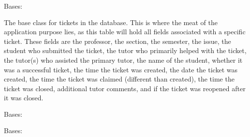 \documentclass[letterpaper,10pt,english]{sphinxmanual}
\begin{document}
\begin{fulllineitems}
\label{\detokenize{models/ticket:api.models.ticket.Ticket}}
\pysigstartsignatures
{}
\pysigstopsignatures
\sphinxAtStartPar
Bases: 

\sphinxAtStartPar
The base class for tickets in the database. This is where the meat of the
application purpose lies, as this table will hold all fields associated
with a specific ticket. These fields are the professor, the section, the
semester, the issue, the student who submitted the ticket, the tutor who
primarily helped with the ticket, the tutor(s) who assisted the primary
tutor, the name of the student, whether it was a successful ticket,
the time the ticket was created, the date the ticket was created, the
time the ticket was claimed (different than created), the time the
ticket was closed, additional tutor comments, and if the ticket was
reopened after it was closed.

\begin{fulllineitems}
\label{\detokenize{models/ticket:api.models.ticket.Ticket.CLOSED}}
\pysigstartsignatures
{}
\pysigstopsignatures
\end{fulllineitems}


\begin{fulllineitems}
\label{\detokenize{models/ticket:api.models.ticket.Ticket.DoesNotExist}}
\pysigstartsignatures
{}
\pysigstopsignatures
\sphinxAtStartPar
Bases: 

\end{fulllineitems}


\begin{fulllineitems}
\label{\detokenize{models/ticket:api.models.ticket.Ticket.MultipleObjectsReturned}}
\pysigstartsignatures
{}
\pysigstopsignatures
\sphinxAtStartPar
Bases: 


\end{fulllineitems}
\end{fulllineitems}
\end{document}
